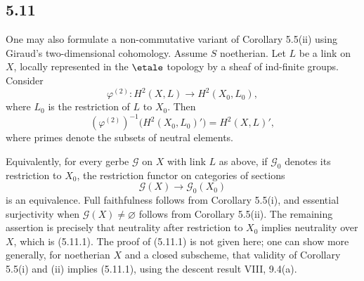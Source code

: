 \subsection*{5.11}
One may also formulate a non-commutative variant of Corollary 5.5(ii) using Giraud's two-dimensional cohomology. Assume \(S\) noetherian. Let \(L\) be a link on \(X\), locally represented in the \(\etale\) topology by a sheaf of ind-finite groups. Consider
\[
\varphi^{(2)}:H^2(X,L)\longrightarrow H^2(X_0,L_0),
\]
where \(L_0\) is the restriction of \(L\) to \(X_0\). Then
\[
(\varphi^{(2)})^{-1}\bigl(H^2(X_0,L_0)'\bigr)=H^2(X,L)',
\tag{5.11.1}
\]
where primes denote the subsets of neutral elements.

Equivalently, for every gerbe \(\mathcal G\) on \(X\) with link \(L\) as above, if \(\mathcal G_0\) denotes its restriction to \(X_0\), the restriction functor on categories of sections
\[
\mathcal G(X)\longrightarrow\mathcal G_0(X_0)
\]
is an equivalence. Full faithfulness follows from Corollary 5.5(i), and essential surjectivity when \(\mathcal G(X)\ne\varnothing\) follows from Corollary 5.5(ii). The remaining assertion is precisely that neutrality after restriction to \(X_0\) implies neutrality over \(X\), which is (5.11.1). The proof of (5.11.1) is not given here; one can show more generally, for noetherian \(X\) and a closed subscheme, that validity of Corollary 5.5(i) and (ii) implies (5.11.1), using the descent result VIII, 9.4(a).
